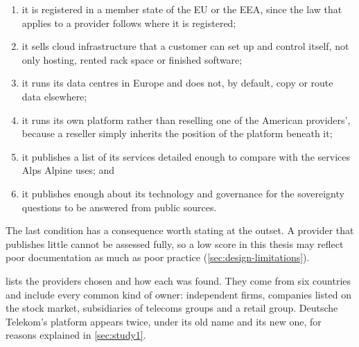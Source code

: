 \begin{enumerate}
  \item it is registered in a member state of the \ac{EU} or the \ac{EEA}, since
        the law that applies to a provider follows where it is registered;
  \item it sells cloud infrastructure that a customer can set up and control
        itself, not only hosting, rented rack space or finished software;
  \item it runs its data centres in Europe and does not, by default, copy or route
        data elsewhere;
  \item it runs its own platform rather than reselling one of the American
        providers', because a reseller simply inherits the position of the
        platform beneath it;
  \item it publishes a list of its services detailed enough to compare with the
        services Alps Alpine uses; and
  \item it publishes enough about its technology and governance for the
        sovereignty questions to be answered from public sources.
\end{enumerate}

The last condition has a consequence worth stating at the outset. A provider that
publishes little cannot be assessed fully, so a low score in this thesis may
reflect poor documentation as much as poor practice
(\cref{sec:design-limitations}).

 lists the providers chosen and how each was found. They come
from six countries and include every common kind of owner: independent firms,
companies listed on the stock market, subsidiaries of telecoms groups and a
retail group. Deutsche Telekom's platform appears twice, under its old name and its
new one, for reasons explained in \cref{sec:study1}.

